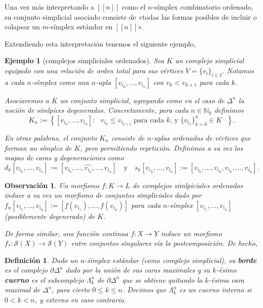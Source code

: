 \documentclass[11pt]{report}
\theoremstyle{colored}
\newtheorem{definition}{Definición}[section]
\newtheorem{remark}{Observación}[section]
\newtheorem{example}{Ejemplo}[section]
\newcommand{\N}{\mathbb{N}}
\newcommand{\nat}[1]{[\![#1]\!]}
\newcommand{\ord}[1]{\nat{#1}}
\renewcommand{\ss}[1]{\Delta^{#1}}
\newcommand{\bss}[1]{\partial \ss{n}}
\newcommand{\horn}[2]{\Lambda^{#1}_{#2}}
\begin{document}
Una vez más interpretando a $\ord{n}$ como el $n$-símplex combinatorio ordenado, su conjunto simplicial asociado consiste de «todas las formas posibles de incluir o colapsar un $m$-símplex estándar en $\nat{n}$».

Extendiendo esta interpretación tenemos el siguiente ejemplo,

\begin{example}[complejos simpliciales ordenados] Sea $K$ un complejo simplicial equipado con una relación de orden total para sus vértices $V = \{v_i\}_{i \in I}$. Notamos a cada $n$-símplex como una $n$-upla $[v_{i_0},\dots, v_{i_n}]$ con $v_k < v_{k+1}$ para cada $k$.

Asociaremos a $K$ un conjunto simplicial, agregando como en el caso de $\ss{n}$ la noción de \textit{símlpices degenerados}. Concretamente, para cada $n \in \N_0$ definimos
\[
K_n := \left\{[v_{i_0}, \dots, v_{i_n}] : \text{ $v_{i_k} \leq v_{i_{k+1}}$ para cada $k$, y $\{v_{i_k}\}_{k = 0}^n \in K$ }\right\}.
\]

En otras palabras, el conjunto $K_n$ consiste de $n$-uplas ordenadas de vértices que forman un símplex de $K$, pero permitiendo repetición. Definimos a su vez los mapas de caras y degeneraciones como
\[
d_k[v_{i_0}, \dots, v_{i_n}] := [v_{i_0},\dots,\widehat{v_{i_k}},\dots, v_{i_n}] \quad \text{y} \quad
s_k[v_{i_0}, \dots, v_{i_n}] := [v_{i_0},\dots,v_{i_k},v_{i_k}, \dots, v_{i_n}].
\]
\end{example}

\begin{remark} Un morfismo $f : K \to L$ de complejos simlpiciales ordenados induce a su vez un morfismo de conjuntos simpliciales dado por $f_n[v_{i_1}, \dots, v_{i_n}] := [f(v_{i_1}), \dots, f(v_{i_n})]$ para cada $n$-símplex $[v_{i_1}, \dots, v_{i_n}]$ (posiblemente degenerado) de $K$.

De forma similar, una función continua $f : X \to Y$ induce un morfismo $f_* : \mathcal{S}(X) \to \mathcal{S}(Y)$ entre conjuntos singulares vía la postcomposición. De hecho, 
\end{remark}

\begin{definition} Dado un $n$-śimplex estándar (como complejo simplicial), su \textbf{borde} es el complejo $\bss{n}$ dado por la unión de sus caras maximales y su $k$-ésimo \textbf{cuerno} es el subcomplejo $\horn{n}{k}$ de $\bss{n}$ que se obtiene quitando la $k$-ésima cara maximal de $\ss{n}$, para cierto $0 \leq k \leq n$. Decimos que $\horn{n}{k}$ es un cuerno \textit{interno} si $0 < k < n$, y \textit{externo} en caso contrario.
\end{definition}
\end{document}
